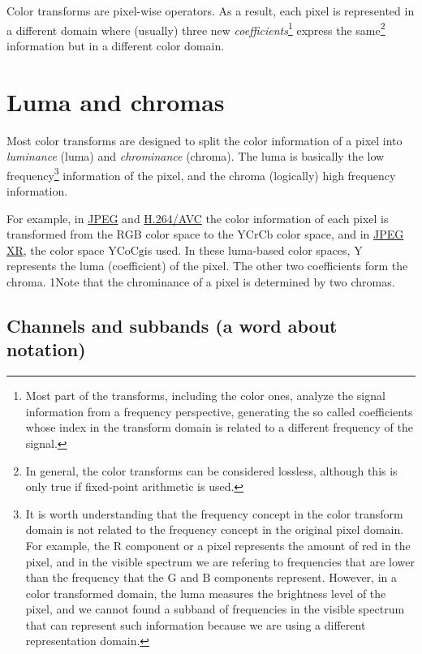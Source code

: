Color transforms are pixel-wise operators. As a result, each pixel is
represented in a different domain where (usually) three new
\emph{coefficients}\footnote{Most part of the transforms, including
the color ones, analyze the signal information from a frequency
perspective, generating the so called coefficients whose index in the
transform domain is related to a different frequency of the signal.}
express the same\footnote{In general, the color transforms can be
considered lossless, although this is only true if fixed-point
arithmetic is used.} information but in a different color domain.

\section{Luma and chromas}

Most color transforms are designed to split the color information of a
pixel into \emph{luminance} (luma) and \emph{chrominance}
(chroma). The luma is basically the low frequency\footnote{It is worth
  understanding that the frequency concept in the color transform
  domain is not related to the frequency concept in the original pixel
  domain. For example, the $\text{R}$ component or a pixel represents
  the amount of red in the pixel, and in the visible spectrum we are
  refering to frequencies that are lower than the frequency that the
  $\text{G}$ and $\text{B}$ components represent. However, in a color
  transformed domain, the luma measures the brightness level of the
  pixel, and we cannot found a subband of frequencies in the visible
  spectrum that can represent such information because we are using a
  different representation domain.} information of the pixel, and the
chroma (logically) high frequency information.

For example, in
\href{https://en.wikipedia.org/wiki/JPEG#JPEG_codec_example}{JPEG} and
\href{https://en.wikipedia.org/wiki/Advanced_Video_Coding#Fidelity_range_extensions_and_professional_profiles}{H.264/AVC}
the color information of each pixel is transformed from the
$\text{RGB}$ color space to the $\text{YCrCb}$ color space, and in
\href{https://en.wikipedia.org/wiki/JPEG_XR#Description}{JPEG XR}, the
color space $\text{YCoCg}$is used. In these luma-based color spaces,
$\text{Y}$ represents the luma (coefficient) of the pixel. The other
two coefficients form the chroma. 1Note that the chrominance of a pixel
is determined by two chromas.

\subsection*{Channels and subbands (a word about notation)}

